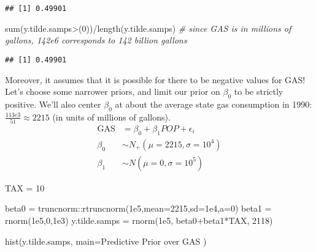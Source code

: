 \documentclass[
]{article}
\newenvironment{Shaded}{\begin{snugshade}}{\end{snugshade}}
\newcommand{\AttributeTok}[1]{\textcolor[rgb]{0.77,0.63,0.00}{#1}}
\newcommand{\CommentTok}[1]{\textcolor[rgb]{0.56,0.35,0.01}{\textit{#1}}}
\newcommand{\DecValTok}[1]{\textcolor[rgb]{0.00,0.00,0.81}{#1}}
\newcommand{\FloatTok}[1]{\textcolor[rgb]{0.00,0.00,0.81}{#1}}
\newcommand{\FunctionTok}[1]{\textcolor[rgb]{0.00,0.00,0.00}{#1}}
\newcommand{\NormalTok}[1]{#1}
\newcommand{\OtherTok}[1]{\textcolor[rgb]{0.56,0.35,0.01}{#1}}
\newcommand{\SpecialCharTok}[1]{\textcolor[rgb]{0.00,0.00,0.00}{#1}}
\newcommand{\StringTok}[1]{\textcolor[rgb]{0.31,0.60,0.02}{#1}}
\begin{document}
\begin{verbatim}
## [1] 0.49901
\end{verbatim}

\begin{Shaded}
\begin{Highlighting}[]
\FunctionTok{sum}\NormalTok{(y.tilde.samps}\SpecialCharTok{\textgreater{}}\NormalTok{(}\DecValTok{0}\NormalTok{))}\SpecialCharTok{/}\FunctionTok{length}\NormalTok{(y.tilde.samps) }\CommentTok{\# since GAS is in millions of gallons, 142e6 corresponds to 142 billion gallons}
\end{Highlighting}
\end{Shaded}

\begin{verbatim}
## [1] 0.49901
\end{verbatim}

Moreover, it assumes that it is possible for there to be negative values
for GAS! Let's choose some narrower priors, and limit our prior on
\(\beta_0\) to be strictly positive. We'll also center \(\beta_0\) at
about the average state gas consumption in 1990:
\(\frac{113e3}{51}\approx 2215\) (in units of millions of gallons). \[
\begin{split}
\text{GAS} &= \beta_0 + \beta_1 POP + \epsilon_i\\
\beta_0 &\sim N_+(\mu=2215, \sigma=10^4)\\
\beta_1 &\sim N(\mu=0, \sigma=10^5)
\end{split}
\]

\begin{Shaded}
\begin{Highlighting}[]
\NormalTok{TAX }\OtherTok{=} \DecValTok{10}

\NormalTok{beta0 }\OtherTok{=}\NormalTok{ truncnorm}\SpecialCharTok{::}\FunctionTok{rtruncnorm}\NormalTok{(}\FloatTok{1e5}\NormalTok{,}\AttributeTok{mean=}\DecValTok{2215}\NormalTok{,}\AttributeTok{sd=}\FloatTok{1e4}\NormalTok{,}\AttributeTok{a=}\DecValTok{0}\NormalTok{)}
\NormalTok{beta1 }\OtherTok{=} \FunctionTok{rnorm}\NormalTok{(}\FloatTok{1e5}\NormalTok{,}\DecValTok{0}\NormalTok{,}\FloatTok{1e3}\NormalTok{)}
\NormalTok{y.tilde.samps }\OtherTok{=} \FunctionTok{rnorm}\NormalTok{(}\FloatTok{1e5}\NormalTok{, beta0}\SpecialCharTok{+}\NormalTok{beta1}\SpecialCharTok{*}\NormalTok{TAX, }\DecValTok{2118}\NormalTok{)}

\FunctionTok{hist}\NormalTok{(y.tilde.samps, }\AttributeTok{main=}\StringTok{\textquotesingle{}Predictive Prior over GAS\textquotesingle{}}\NormalTok{ )}
\end{Highlighting}
\end{Shaded}
\end{document}
